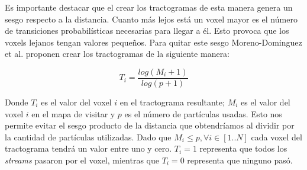 Es importante destacar que el crear los tractogramas de esta manera genera un 
sesgo respecto a la distancia. Cuanto m\'as lejos est\'a un voxel mayor es el 
n\'umero de transiciones probabil\'isticas necesarias para llegar a \'el. Esto 
provoca que los voxels lejanos tengan valores peque\~nos. Para quitar este sesgo
Moreno-Dominguez et al. \cite{Moreno-Dominguez2014} proponen crear los tractogramas
de la siguiente manera:

\begin{equation}
\label{eq:normalizacion}
T_i = \frac{ log(M_i + 1)}{log(p+1)}
\end{equation}

Donde $T_i$ es el valor del voxel $i$ en el tractograma resultante; $M_i$ es 
el valor del voxel $i$ en el mapa de visitar y $p$ es el n\'umero de part\'iculas
usadas. Esto nos permite evitar el sesgo producto de la distancia que obtendr\'iamos
al dividir por la cantidad de part\'iculas utilizadas. Dado que 
$M_i \leq p, \forall i \in [1..N]$ cada voxel del tractograma tendr\'a un valor
entre uno y cero. $T_i = 1$ representa que todos los \textit{streams} pasaron por
el voxel, mientras que $T_i = 0$ representa que ninguno pas\'o. \\
